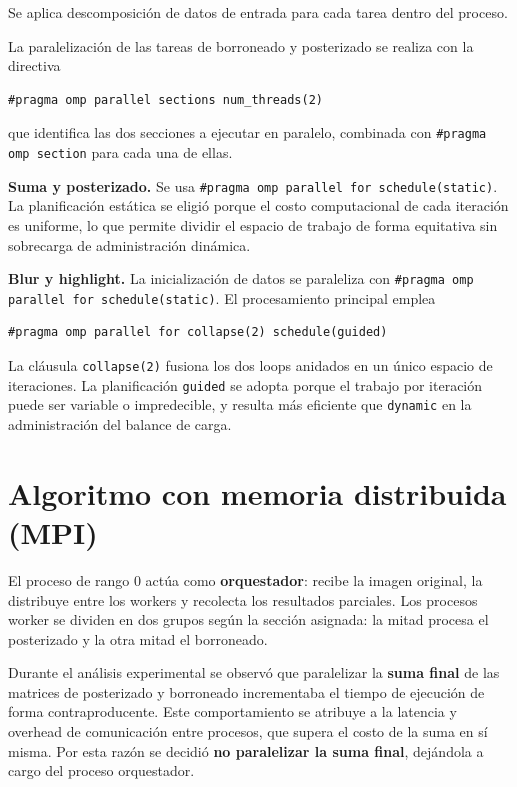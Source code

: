 Se aplica descomposición de datos de entrada para cada tarea dentro del proceso.
 
La paralelización de las tareas de borroneado y posterizado se realiza con la directiva
 
\begin{verbatim}
#pragma omp parallel sections num_threads(2)
\end{verbatim}
 
que identifica las dos secciones a ejecutar en paralelo, combinada con
\texttt{\#pragma omp section} para cada una de ellas.
 
\textbf{Suma y posterizado.} Se usa \texttt{\#pragma omp parallel for schedule(static)}.
La planificación estática se eligió porque el costo computacional de cada iteración es
uniforme, lo que permite dividir el espacio de trabajo de forma equitativa sin sobrecarga
de administración dinámica.
 
\textbf{Blur y highlight.} La inicialización de datos se paraleliza con
\texttt{\#pragma omp parallel for schedule(static)}. El procesamiento principal emplea
 
\begin{verbatim}
#pragma omp parallel for collapse(2) schedule(guided)
\end{verbatim}
 
La cláusula \texttt{collapse(2)} fusiona los dos loops anidados en un único espacio de
iteraciones. La planificación \texttt{guided} se adopta porque el trabajo por iteración puede
ser variable o impredecible, y resulta más eficiente que \texttt{dynamic} en la administración
del balance de carga.
 
\section{Algoritmo con memoria distribuida (MPI)}
 
El proceso de rango 0 actúa como \textbf{orquestador}: recibe la imagen original, la
distribuye entre los workers y recolecta los resultados parciales. Los procesos worker se
dividen en dos grupos según la sección asignada: la mitad procesa el posterizado y la otra
mitad el borroneado.
 
Durante el análisis experimental se observó que paralelizar la \textbf{suma final} de las
matrices de posterizado y borroneado incrementaba el tiempo de ejecución de forma
contraproducente. Este comportamiento se atribuye a la latencia y overhead de comunicación
entre procesos, que supera el costo de la suma en sí misma. Por esta razón se decidió
\textbf{no paralelizar la suma final}, dejándola a cargo del proceso orquestador.
 
